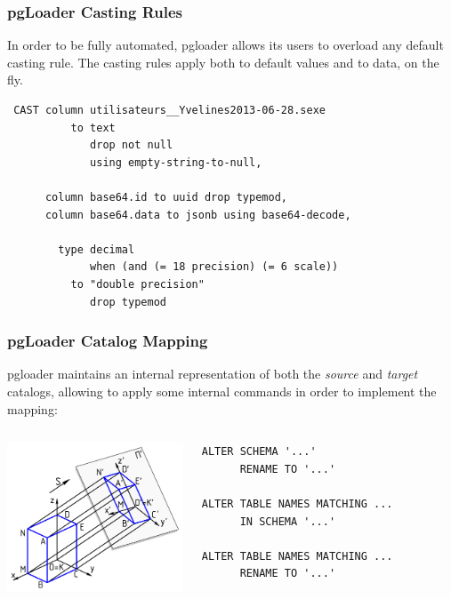 \documentclass{beamer}
\begin{document}
\begin{frame}[fragile]
  \frametitle{pgLoader Casting Rules}

  In order to be fully automated, pgloader allows its users to overload any
  default casting rule. The casting rules apply both to default values and
  to data, on the fly.

  \vfill
  
  \begin{verbatim}
 CAST column utilisateurs__Yvelines2013-06-28.sexe
          to text
             drop not null
             using empty-string-to-null,
             
      column base64.id to uuid drop typemod,
      column base64.data to jsonb using base64-decode,

        type decimal
             when (and (= 18 precision) (= 6 scale))
          to "double precision"
             drop typemod
  \end{verbatim}
\end{frame}

\begin{frame}[fragile]
  \frametitle{pgLoader Catalog Mapping}

  pgloader maintains an internal representation of both the \textit{source}
  and \textit{target} catalogs, allowing to apply some internal commands in
  order to implement the mapping:

  \vfill
  
  \begin{columns}[c]
    \begin{center}
      \includegraphics[height=12em]{Axonometric_projection.png}
    \end{center}

    \begin{center}
      \begin{minipage}{0,8\textwidth}
        \begin{verbatim}
ALTER SCHEMA '...'
      RENAME TO '...'

ALTER TABLE NAMES MATCHING ...
      IN SCHEMA '...'

ALTER TABLE NAMES MATCHING ...
      RENAME TO '...'
        \end{verbatim}
      \end{minipage}
    \end{center}
  \end{columns}
\end{frame}
\end{document}
